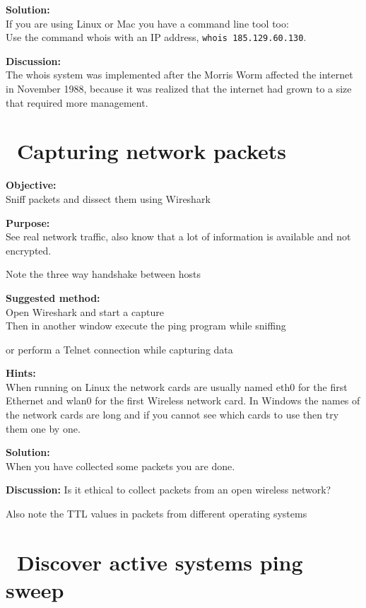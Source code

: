 \documentclass[a4paper,11pt,notitlepage]{report}
\begin{document}
{\bf Solution:}\\
If you are using Linux or Mac you have a command line tool too:\\
Use the command whois with an IP address, \verb+whois 185.129.60.130+.

{\bf Discussion:}\\
The whois system was implemented after the Morris Worm affected the internet in November 1988, because it was realized that the internet had grown to a size that required more management.

\chapter{\faInfoCircle\ Capturing network packets}
\label{ex:wireshark-capture}



{\bf Objective:}\\
Sniff packets and dissect them using Wireshark

{\bf Purpose:}\\
See real network traffic, also know that a lot of information is available and not encrypted.

Note the three way handshake between hosts

{\bf Suggested method:}\\
Open Wireshark and start a capture\\
Then in another window execute the ping program while sniffing

or perform a Telnet connection while capturing data

{\bf Hints:}\\
When running on Linux the network cards are usually named eth0 for the first Ethernet and wlan0 for the first Wireless network card. In Windows the names of the network cards are long and if you cannot see which cards to use then try them one by one.

{\bf Solution:}\\
When you have collected some packets you are done.

{\bf Discussion:}
Is it ethical to collect packets from an open wireless network?

Also note the TTL values in packets from different operating systems

\chapter{\faInfoCircle\ Discover active systems ping sweep}
\label{ex:nmap-pingsweep}
\end{document}
